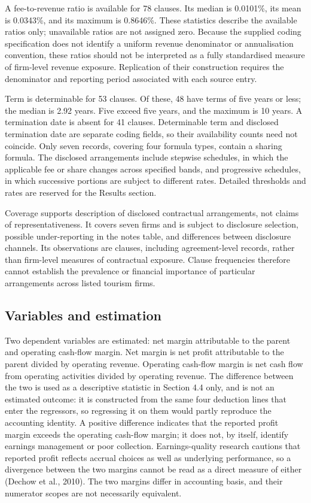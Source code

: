 \documentclass[review,3p,times]{elsarticle}
\begin{document}
A fee-to-revenue ratio is available for 78 clauses. Its median is 0.0101\%, its mean is 0.0343\%, and its maximum is 0.8646\%. These statistics describe the available ratios only; unavailable ratios are not assigned zero. Because the supplied coding specification does not identify a uniform revenue denominator or annualisation convention, these ratios should not be interpreted as a fully standardised measure of firm-level revenue exposure. Replication of their construction requires the denominator and reporting period associated with each source entry.

Term is determinable for 53 clauses. Of these, 48 have terms of five years or less; the median is 2.92 years. Five exceed five years, and the maximum is 10 years. A termination date is absent for 41 clauses. Determinable term and disclosed termination date are separate coding fields, so their availability counts need not coincide. Only seven records, covering four formula types, contain a sharing formula. The disclosed arrangements include stepwise schedules, in which the applicable fee or share changes across specified bands, and progressive schedules, in which successive portions are subject to different rates. Detailed thresholds and rates are reserved for the Results section.

Coverage supports description of disclosed contractual arrangements, not claims of representativeness. It covers seven firms and is subject to disclosure selection, possible under-reporting in the notes table, and differences between disclosure channels. Its observations are clauses, including agreement-level records, rather than firm-level measures of contractual exposure. Clause frequencies therefore cannot establish the prevalence or financial importance of particular arrangements across listed tourism firms.

\subsection{Variables and estimation}

Two dependent variables are estimated: net margin attributable to the parent and operating cash-flow margin. Net margin is net profit attributable to the parent divided by operating revenue. Operating cash-flow margin is net cash flow from operating activities divided by operating revenue. The difference between the two is used as a descriptive statistic in Section 4.4 only, and is not an estimated outcome: it is constructed from the same four deduction lines that enter the regressors, so regressing it on them would partly reproduce the accounting identity. A positive difference indicates that the reported profit margin exceeds the operating cash-flow margin; it does not, by itself, identify earnings management or poor collection. Earnings-quality research cautions that reported profit reflects accrual choices as well as underlying performance, so a divergence between the two margins cannot be read as a direct measure of either (Dechow et al., 2010). The two margins differ in accounting basis, and their numerator scopes are not necessarily equivalent.
\end{document}
